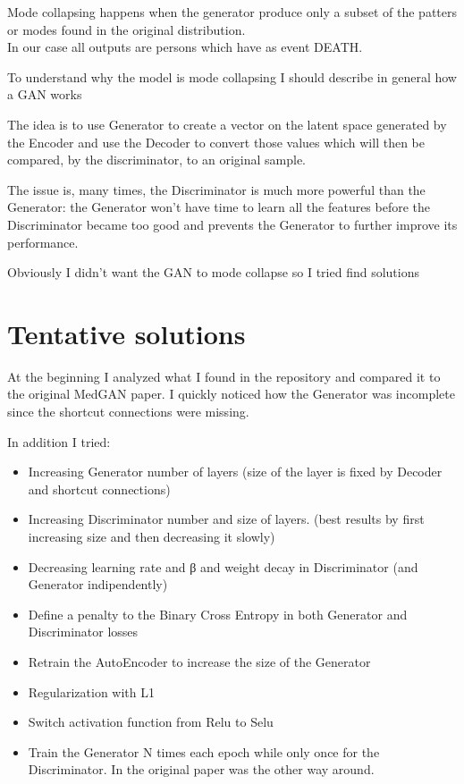 \documentclass[
  letterpaper,
  DIV=11,
  numbers=noendperiod]{scrreprt}
\providecommand{\tightlist}{%
  \setlength{\itemsep}{0pt}\setlength{\parskip}{0pt}}\usepackage{longtable,booktabs,array}
\begin{document}
Mode collapsing happens when the generator produce only a subset of the
patters or modes found in the original distribution.\\
In our case all outputs are persons which have as event DEATH.

To understand why the model is mode collapsing I should describe in
general how a GAN works

The idea is to use Generator to create a vector on the latent space
generated by the Encoder and use the Decoder to convert those values
which will then be compared, by the discriminator, to an original
sample.

The issue is, many times, the Discriminator is much more powerful than
the Generator: the Generator won't have time to learn all the features
before the Discriminator became too good and prevents the Generator to
further improve its performance.

Obviously I didn't want the GAN to mode collapse so I tried find
solutions

\hypertarget{tentative-solutions}{%
\chapter{Tentative solutions}\label{tentative-solutions}}

At the beginning I analyzed what I found in the repository and compared
it to the original MedGAN paper. I quickly noticed how the Generator was
incomplete since the shortcut connections were missing.

In addition I tried:

\begin{itemize}
\tightlist
\item
  Increasing Generator number of layers (size of the layer is fixed by
  Decoder and shortcut connections)
\item
  Increasing Discriminator number and size of layers. (best results by
  first increasing size and then decreasing it slowly)
\item
  Decreasing learning rate and β and weight decay in Discriminator (and
  Generator indipendently)
\item
  Define a penalty to the Binary Cross Entropy in both Generator and
  Discriminator losses
\item
  Retrain the AutoEncoder to increase the size of the Generator
\item
  Regularization with L1
\item
  Switch activation function from Relu to Selu
\item
  Train the Generator N times each epoch while only once for the
  Discriminator. In the original paper was the other way around.
\end{itemize}
\end{document}
